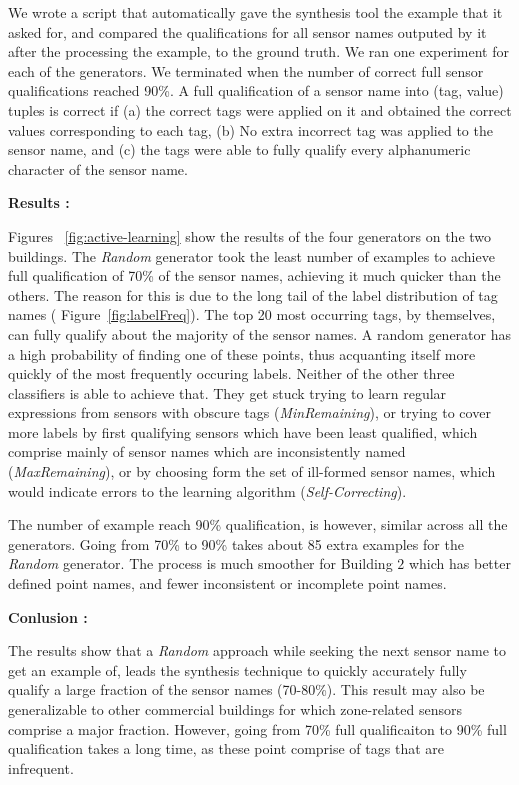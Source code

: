 We wrote a script that automatically gave the synthesis tool the example that it asked for, and compared the qualifications for all sensor names outputed by it after the processing the example,  to the ground truth. We ran one experiment for each of the generators. We terminated when the number of correct full sensor qualifications reached 90\%. A full qualification of a sensor name into (tag, value) tuples is correct if (a) the correct tags were applied on it and  obtained the correct values corresponding to each tag, (b) No extra incorrect tag was applied to the sensor name, and (c) the tags were able to fully qualify every alphanumeric character of the sensor name.


{\bf Results : }

Figures ~\ref{fig:active-learning} show the results of the four generators on the two buildings. The \emph{Random} generator took the least number of examples to achieve full qualification of 70\% of the sensor names, achieving it much quicker than the others. The reason for this is due to the long tail of the label distribution of tag names (  Figure~\ref{fig:labelFreq}). The top 20 most occurring tags, by themselves, can fully qualify about the majority of the sensor names. A random generator has a high probability of finding one of these points, thus acquanting itself more quickly of the most frequently occuring labels. Neither of the other three classifiers is able to achieve that. They get stuck trying to learn regular expressions from sensors with obscure tags (\emph{MinRemaining}), or trying to cover more labels by first qualifying sensors which have been least qualified, which comprise mainly of sensor names which are inconsistently named (\emph{MaxRemaining}), or by choosing form the set of ill-formed sensor names, which would indicate errors to the learning algorithm (\emph{Self-Correcting}).

The number of example reach 90\% qualification, is however, similar across all the generators. Going from 70\% to 90\% takes about 85 extra examples for the {\it Random} generator. The process is much smoother for Building $2$ which has better defined point names, and fewer inconsistent or incomplete point names.

{\bf Conlusion :}

The results show that a {\it Random} approach while seeking the next sensor name to get an example of, leads the synthesis technique to quickly accurately fully qualify a large fraction of the sensor names (70-80\%). This result may also be generalizable to other commercial buildings for which zone-related sensors comprise a major fraction. However, going from 70\% full qualificaiton to 90\% full qualification takes a long time, as these point comprise of tags that are infrequent.

